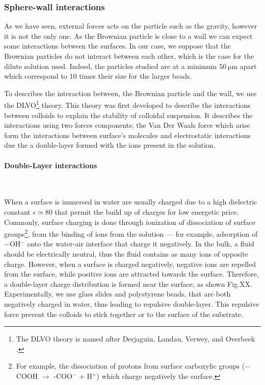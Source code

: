 \subsubsection{Sphere-wall interactions}

As we have seen, external forces acts on the particle such as the gravity, however it is not the only one. As the Brownian particle is close to a wall we can expect some interactions between the surfaces. In our case, we suppose that the Brownian particles do not interact between each other, which is the case for the dilute solution used. Indeed, the particles studied are at a minimum $50 ~ \mathrm{\mu m}$ apart which correspond to 10 times their size for the larger beads. 

To describes the interaction between, the Brownian particle and the wall, we use the DLVO\footnote{The DLVO theory is named after Derjaguin, Landau, Verwey, and Overbeek \cite{israelachvili_intermolecular_2015}.} theory. This theory was first developed to describe the interactions between colloids to explain the stability of colloidal suspension. It describes the interactions using two forces components; the Van Der Waals force which arise form the interactions between surface's molecules and electrostatic interactions due the a double-layer formed with the ions present in the solution. 

\paragraph{Double-Layer interactions}\mbox{}\\
\vspace{0.10cm}


When a surface is immersed in water are usually charged \cite{israelachvili_intermolecular_2015} due to a high dielectric constant $\epsilon \simeq 80$ that permit the build up of charges for low energetic price. Commonly, surface charging is done through ionization of dissociation of surface groups\footnote{For example, the dissociation of protons from surface carboxylic groups \cite{israelachvili_intermolecular_2015} ($-$COOH $\rightarrow$ -COO$^-$ + H$^+$) which charge negatively the surface.}, from the binding of ions from the solution --- for example, adsorption of $-$OH$^-$ onto the water-air interface that charge it negatively. In the bulk, a fluid should be electrically neutral, thus the fluid contains as many ions of opposite charge. However, when a surface is charged negatively, negative ions are repelled from the surface, while positive ions are attracted towards the surface.  Therefore, a double-layer charge distribution is formed near the surface, as shown Fig.XX. Experimentally, we use glass slides and polystyrene beads, that are both negatively charged in water, thus leading to repulsive double-layer. This repulsive force prevent the colloids to stick together or to the surface of the substrate. 






